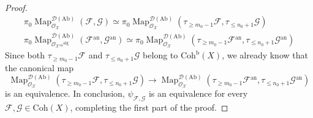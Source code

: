 \documentclass[12pt,a4paper,reqno]{amsart}
\theoremstyle{plain}
\theoremstyle{definition}
\theoremstyle{remark}
\numberwithin{equation}{section}
\begin{document}
\begin{proof}
	\begin{gather*}
		\pi_0 \operatorname{Map}^{{{\mathcal D}({\mathrm{Ab}})}}_{{\mathcal O}_{\mathcal X}}({\mathcal F}, {\mathcal G}) \simeq \pi_0 \operatorname{Map}^{{{\mathcal D}({\mathrm{Ab}})}}_{{\mathcal O}_{\mathcal X}}(\tau_{\ge m_0 - 1} {\mathcal F}, \tau_{\le n_0 + 1} {\mathcal G}) \\
		\pi_0 \operatorname{Map}^{{{\mathcal D}({\mathrm{Ab}})}}_{{\mathcal O}_{{\mathcal X}{^\mathrm{an}}}{^\mathrm{alg}}}({\mathcal F}{^\mathrm{an}}, {\mathcal G}{^\mathrm{an}}) \simeq \pi_0 \operatorname{Map}^{{{\mathcal D}({\mathrm{Ab}})}}_{{\mathcal O}_{\mathcal X}}(\tau_{\ge m_0 - 1} {\mathcal F}{^\mathrm{an}}, \tau_{\le n_0 + 1} {\mathcal G}{^\mathrm{an}})
	\end{gather*}
	Since both $\tau_{\ge m_0 - 1} {\mathcal F}$ and $\tau_{\le n_0 + 1} {\mathcal G}$ belong to ${\mathrm{Coh}^{\mathrm{b}}}(X)$, we already know that the canonical map
	\[ \operatorname{Map}^{{{\mathcal D}({\mathrm{Ab}})}}_{{\mathcal O}_{\mathcal X}}(\tau_{\ge m_0 - 1} {\mathcal F}, \tau_{\le n_0 + 1} {\mathcal G}) \to \operatorname{Map}^{{{\mathcal D}({\mathrm{Ab}})}}_{{\mathcal O}_{\mathcal X}}(\tau_{\ge m_0 - 1} {\mathcal F}{^\mathrm{an}}, \tau_{\le n_0 + 1} {\mathcal G}{^\mathrm{an}}) \]
	is an equivalence.
	In conclusion, $\psi_{{\mathcal F}, {\mathcal G}}$ is an equivalence for every ${\mathcal F}, {\mathcal G} \in {\mathrm{Coh}}(X)$, completing the first part of the proof.


\end{proof}
\end{document}
